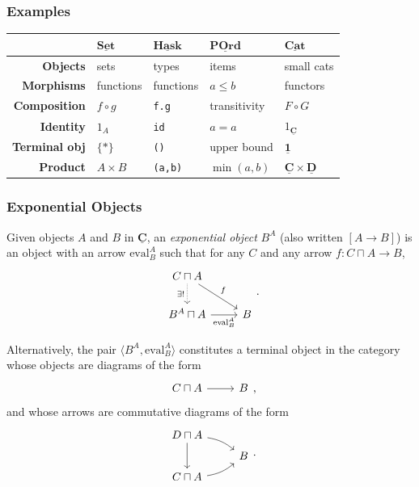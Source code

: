 \documentclass[10pt]{beamer}
\newcommand{\Cat}[1]{\ensuremath{\underline{\mathbf{#1}}}}
\theoremstyle{definition}
\theoremstyle{remark}
\numberwithin{equation}{section}
\begin{document}
\begin{frame}[fragile]
  \frametitle{Examples}

  \begin{center}
    \begin{tabular}{r l l l l}\toprule
    & $\Cat{Set}$ & $\Cat{Hask}$ & $\Cat{POrd}$ & $\Cat{Cat}$ \\\midrule
    \textbf{Objects} & sets & types & items & small cats \\
    \textbf{Morphisms} & functions & functions & $a \leq b$ & functors \\
    \textbf{Composition} & $f \circ g$ & \lstinline!f.g! & transitivity & $F \circ G$ \\
    \textbf{Identity} & $1_A$ & {\lstinline!id!} & $a = a$ & $1_{\Cat{C}}$ \\
    \textbf{Terminal obj\rlap{.}} & $\{*\}$ & \lstinline!()! & upper bound & $\Cat{1}$ \\
    \textbf{Product} & $A \times B$ & \lstinline!(a,b)! & $\min(a,b)$ & $\Cat{C} \times \Cat{D}$ \\
    \bottomrule
  \end{tabular}
  \end{center}
\end{frame}

\begin{frame}[fragile]
  \frametitle{Exponential Objects}

  Given objects $A$ and $B$ in $\Cat{C}$, an \emph{exponential object} $B^A$
  (also written $[A \rightarrow B]$) is an object with an arrow $\mathrm{eval}_B^A$
  such that for any $C$ and any arrow $f\colon C \sqcap A \rightarrow B$,
  \[
  \begin{tikzcd}
    C \sqcap A \arrow[swap,densely dotted]{d}{\exists!} \arrow{dr}{f} & \\
    B^A \sqcap A \arrow[swap]{r}{\mathrm{eval}_B^A} & B
    \end{tikzcd}\rlap{.}
  \]
  
  Alternatively, the pair $\langle {B^A,\mathrm{eval}_B^A} \rangle$ constitutes a terminal
  object in the category whose objects are diagrams of the form
  \[
  \begin{tikzcd}
    C \sqcap A \arrow{r} & B
  \end{tikzcd}\rlap{,}
  \]
  and whose arrows are commutative diagrams of the form
  \[
  \begin{tikzcd}[row sep=tiny]
    D \sqcap A \arrow{dd} \arrow[bend left=15]{dr} & \\
    & B \\
    C \sqcap A \arrow[bend right=15]{ur} &
  \end{tikzcd}\rlap{.}
  \]
\end{frame}
\end{document}
